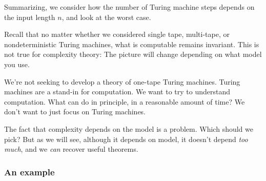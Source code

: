 Summarizing, we consider how the number of Turing machine steps depends on the input length $n$, and look at the worst case.

Recall that no matter whether we considered single tape, multi-tape, or nondeterministic Turing machines, what is computable remains invariant. This is not true for complexity theory: The picture will change depending on what model you use. 

We're not seeking to develop a theory of one-tape Turing machines. Turing machines are a stand-in for computation. We want to try to understand computation. What can do in principle, in a reasonable amount of time? We don't want to just focus on Turing machines.

The fact that complexity depends on the model is a problem. Which should we pick? But as we will see, although it depends on model, it doesn't depend {\it too much}, and we {\it can} recover useful theorems.

\subsubsection{An example}

